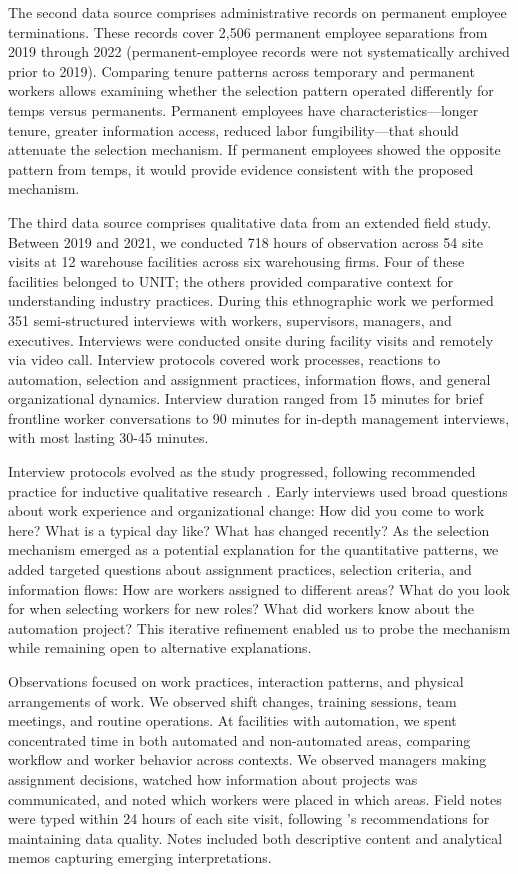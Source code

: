 \documentclass[12pt]{article}
\begin{document}
The second data source comprises administrative records on permanent employee terminations. These records cover 2,506 permanent employee separations from 2019 through 2022 (permanent-employee records were not systematically archived prior to 2019). Comparing tenure patterns across temporary and permanent workers allows examining whether the selection pattern operated differently for temps versus permanents. Permanent employees have characteristics---longer tenure, greater information access, reduced labor fungibility---that should attenuate the selection mechanism. If permanent employees showed the opposite pattern from temps, it would provide evidence consistent with the proposed mechanism.

The third data source comprises qualitative data from an extended field study. Between 2019 and 2021, we conducted 718 hours of observation across 54 site visits at 12 warehouse facilities across six warehousing firms. Four of these facilities belonged to UNIT; the others provided comparative context for understanding industry practices. During this ethnographic work we performed 351 semi-structured interviews with workers, supervisors, managers, and executives. Interviews were conducted onsite during facility visits and remotely via video call. Interview protocols covered work processes, reactions to automation, selection and assignment practices, information flows, and general organizational dynamics. Interview duration ranged from 15 minutes for brief frontline worker conversations to 90 minutes for in-depth management interviews, with most lasting 30-45 minutes.

Interview protocols evolved as the study progressed, following recommended practice for inductive qualitative research \citep{eisenhardt1989building}. Early interviews used broad questions about work experience and organizational change: How did you come to work here? What is a typical day like? What has changed recently? As the selection mechanism emerged as a potential explanation for the quantitative patterns, we added targeted questions about assignment practices, selection criteria, and information flows: How are workers assigned to different areas? What do you look for when selecting workers for new roles? What did workers know about the automation project? This iterative refinement enabled us to probe the mechanism while remaining open to alternative explanations.

Observations focused on work practices, interaction patterns, and physical arrangements of work. We observed shift changes, training sessions, team meetings, and routine operations. At facilities with automation, we spent concentrated time in both automated and non-automated areas, comparing workflow and worker behavior across contexts. We observed managers making assignment decisions, watched how information about projects was communicated, and noted which workers were placed in which areas. Field notes were typed within 24 hours of each site visit, following \citet{miles2014qualitative}'s recommendations for maintaining data quality. Notes included both descriptive content and analytical memos capturing emerging interpretations.
\end{document}

